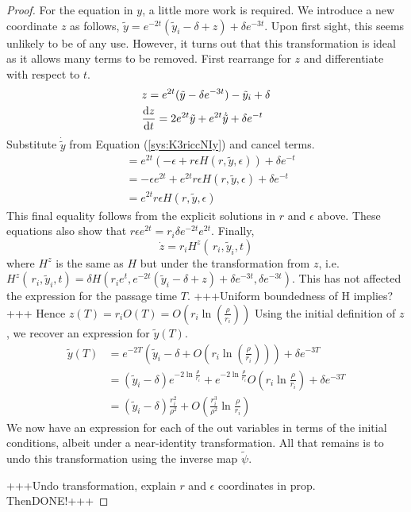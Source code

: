 \begin{proof}
For the equation in $y$, a little more work is required. We introduce a new coordinate $z$ as follows, $\tilde{y}=e^{-2t}(\tilde{y}_i-\delta+z)+\delta  e^{-3t}$. Upon first sight, this seems unlikely to be of any use. However, it turns out that this transformation is ideal as it allows many terms to be removed. First rearrange for $z$ and differentiate with respect to $t$.
\begin{align*}
&z=e^{2t} (\tilde{y}-\delta e^{-3t})-\tilde{y}_i+\delta\\
&\od{z}{t}= 2e^{2t}\tilde{y}+e^{2t}\dot{\tilde{y}}+\delta e^{-t}
\end{align*}
Substitute $\dot{\tilde{y}}$ from Equation (\ref{sys:K3riccNIy}) and cancel terms. 
\begin{align*}
&=e^{2t}(-\epsilon+r\epsilon H(r,\tilde{y},\epsilon))+\delta e^{-t}\\
&=-\epsilon e^{2t}+e^{2t}r\epsilon  H(r,\tilde{y},\epsilon) + \delta e^{-t}\\
&=e^{2t}r\epsilon  H(r,\tilde{y},\epsilon)
\end{align*}
This final equality follows from the explicit solutions in $r$ and $\epsilon$ above. These equations also show that $r\epsilon e^{2t} = r_i\delta e^{-2t}e^{2t}$. Finally,
$$\dot{z} = r_iH^z(\,r_i,\tilde{y}_i,t)$$
where $H^z$ is the same as $H$ but under the transformation from $z$, i.e. $H^z(\,r_i,\tilde{y}_i,t) = \delta H(r_ie^t,e^{-2t}(\tilde{y}_i-\delta+z)+\delta e^{-3t}, \delta e^{-3t})$. This has not affected the expression for the passage time $T$. +++Uniform boundedness of H implies?+++ Hence $z(T)=r_iO(T)=O(r_i\ln (\frac{\rho}{r_i}))$
Using the initial definition of $z$, we recover an expression for $\tilde{y}(T)$.
\begin{align*}
\tilde{y}(T)&=e^{-2T}\left(\tilde{y}_i-\delta+O\left(r_i\ln\left(\frac{\rho}{r_i}\right)\right)\right)+\delta e^{-3T}\\
&=(\tilde{y}_i-\delta)e^{-2\ln\frac{\rho}{r_i}}+e^{-2\ln\frac{\rho}{r_i}}O\left(r_i\ln\frac{\rho}{r_i}\right)+\delta e^{-3T}\\
&=(\tilde{y}_i-\delta)\frac{r_i^2}{\rho^2}+O\left(\frac{r_i^3}{\rho^2}\ln\frac{\rho}{r_i}\right)
\end{align*}
We now have an expression for each of the out variables in terms of the initial conditions, albeit under a near-identity transformation. All that remains is to undo this transformation using the inverse map $\tilde{\psi}$.

+++Undo transformation, explain $r$ and $\epsilon$ coordinates in prop. ThenDONE!+++
\end{proof}
	

